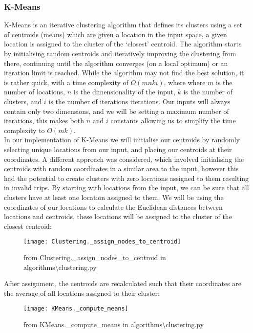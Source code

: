 \subsubsection{K-Means}\label{subsubsec:k-means}
K-Means is an iterative clustering algorithm that defines its clusters using a set of centroids (means) which are
given a location in the input space, a given location is assigned to the cluster of the `closest' centroid.
The algorithm starts by initialising random centroids and iteratively improving the clustering from there, continuing
until the algorithm converges (on a local optimum) or an iteration limit is reached.
While the algorithm may not find the best solution, it is rather quick, with a time complexity of $O(mnki)$,
where where $m$ is the number of locations, $n$ is the dimensionality of the input, $k$ is the number of clusters,
and $i$ is the number of iterations iterations.
Our inputs will always contain only two dimensions, and we will be setting a maximum number of iterations, this
makes both $n$ and $i$ constants allowing us to simplify the time complexity to $O(mk)$.\\

\noindent
In our implementation of K-Means we will initialise our centroids by randomly selecting unique locations from our
input, and placing our centroids at their coordinates.
A different approach was considered, which involved initialising the centroids with random coordinates in a similar
area to the input, however this had the potential to create clusters with zero locations assigned to them resulting
in invalid trips.
By starting with locations from the input, we can be sure that all clusters have at least one location assigned to them.
We will be using the coordinates of our locations to calculate the Euclidean distances between locations and centroids,
these locations will be assigned to the cluster of the closest centroid:
\begin{figure}[H]\label{fig:Clustering._assign_nodes_to_centroid}
    \centering
    \texttt{[image: Clustering.\_assign\_nodes\_to\_centroid]}
    \caption{from Clustering.\_assign\_nodes\_to\_centroid in algorithms\textbackslash clustering.py}
\end{figure}

\noindent
After assignment, the centroids are recalculated such that their coordinates are the average of all locations
assigned to their cluster:
\begin{figure}[H]\label{fig:KMeans._compute_means}
    \centering
    \texttt{[image: KMeans.\_compute\_means]}
    \caption{from KMeans.\_compute\_means in algorithms\textbackslash clustering.py}
\end{figure}

